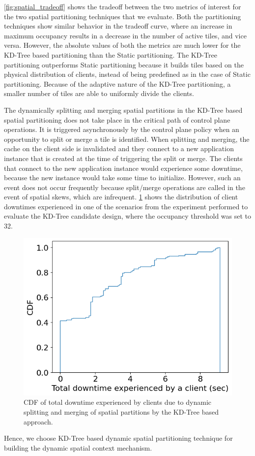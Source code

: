 \cref{fig:spatial_tradeoff} shows the tradeoff between the two metrics of interest for the two spatial partitioning techniques that we evaluate. Both the partitioning techniques show similar behavior in the tradeoff curve, where an increase in maximum occupancy results in a decrease in the number of active tiles, and vice versa. However, the absolute values of both the metrics are much lower for the KD-Tree based partitioning than the Static partitioning. The KD-Tree partitioning outperforms Static partitioning because it builds tiles based on the physical distribution of clients, instead of being predefined as in the case of Static partitioning. Because of the adaptive nature of the KD-Tree partitioning, a smaller number of tiles are able to uniformly divide the clients. 
\par The dynamically splitting and merging spatial partitions in the KD-Tree based spatial partitioning does not take place in the critical path of control plane operations. It is triggered asynchronously by the control plane policy when an opportunity to split or merge a tile is identified. When splitting and merging, the cache on the client side is invalidated and they connect to a new application instance that is created at the time of triggering the split or merge. The clients that connect to the new application instance would experience some downtime, because the new instance would take some time to initialize. However, such an event does not occur frequently because split/merge operations are called in the event of spatial skews, which are infrequent. \cref{fig:spatial_ctx_client_downtimes} shows the distribution of client downtimes experienced in one of the scenarios from the experiment performed to evaluate the KD-Tree candidate design, where the occupancy threshold was set to 32. 
\begin{figure}
\centering
\includegraphics[width=0.5\linewidth]{figures/design_space/spatial/client_downtimes.png}
\caption{CDF of total downtime experienced by clients due to dynamic splitting and merging of spatial partitions by the KD-Tree based approach.}
\label{fig:spatial_ctx_client_downtimes}
\end{figure}
Hence, we choose KD-Tree based dynamic spatial partitioning technique for building the dynamic spatial context mechanism.
